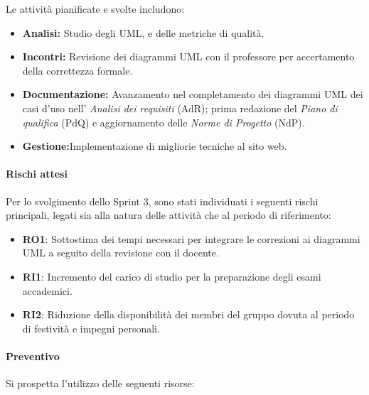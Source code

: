 \documentclass[a4paper,12pt]{article}
\begin{document}
Le attività pianificate e svolte includono:
\begin{itemize}
    \item \textbf{Analisi:} Studio degli UML, e delle metriche di qualit\`a.
    \item \textbf{Incontri:} Revisione dei diagrammi UML con il professore per accertamento della correttezza formale.
    \item {\sloppy \textbf{Documentazione:} Avanzamento nel completamento dei diagrammi UML dei casi d'uso nell' \textit{Analisi dei requisiti} (AdR); prima redazione del \textit{Piano di qualifica} (PdQ) e aggiornamento delle \textit{Norme di Progetto} (NdP). \par}
    \item \textbf{Gestione:}Implementazione di migliorie tecniche al sito web.
\end{itemize}


\paragraph{Rischi attesi}
Per lo svolgimento dello Sprint 3, sono stati individuati i seguenti rischi principali, legati sia alla natura delle attività che al periodo di riferimento:

\begin{itemize}
    \item \textbf{RO1}: Sottostima dei tempi necessari per integrare le correzioni ai diagrammi UML a seguito della revisione con il docente.
    \item \textbf{RI1}: Incremento del carico di studio per la preparazione degli esami accademici.
    \item \textbf{RI2}: Riduzione della disponibilità dei membri del gruppo dovuta al periodo di festività e impegni personali.
\end{itemize}

\paragraph{Preventivo}
Si prospetta l'utilizzo delle seguenti risorse:
\end{document}
